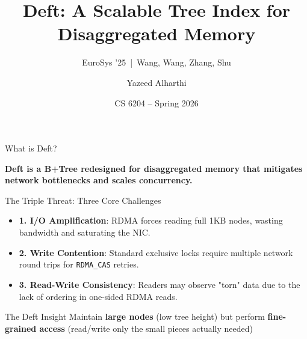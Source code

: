 \documentclass[aspectratio=169,10pt]{beamer}
\title{Deft: A Scalable Tree Index for Disaggregated Memory}
\subtitle{EuroSys '25 \,|\, Wang, Wang, Zhang, Shu}
\author{Yazeed Alharthi}
\date{CS 6204 -- Spring 2026}
\newcommand{\hl}[1]{\textcolor{VTMaroon}{\textbf{#1}}}
\begin{document}
\begin{frame}[plain]
    \maketitle
\end{frame}

\begin{frame}{What is Deft?}

\textbf{Deft is a B+Tree redesigned for disaggregated memory that mitigates network bottlenecks and scales concurrency.}

\vspace{0.3cm}

\begin{block}{The Triple Threat: Three Core Challenges }
    \begin{itemize}
        \item \hl{1. I/O Amplification}: RDMA forces reading full 1KB nodes, wasting bandwidth and saturating the NIC.
        \item \hl{2. Write Contention}: Standard exclusive locks require multiple network round trips for \texttt{RDMA\_CAS} retries.
        \item \hl{3. Read-Write Consistency}: Readers may observe "torn" data due to the lack of ordering in one-sided RDMA reads.
    \end{itemize}
\end{block}

\vspace{0.2cm}

\begin{exampleblock}{The Deft Insight}
    Maintain \textbf{large nodes} (low tree height) but perform \textbf{fine-grained access} (read/write only the small pieces actually needed)
\end{exampleblock}



\end{frame}

\end{document}
